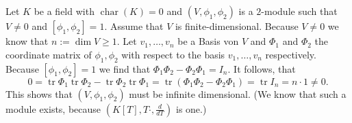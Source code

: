 \documentclass[a4paper,10pt]{article}
\newcommand{\kchar}{\operatorname{char}}
\newcommand{\tr}{\operatorname{tr}}
\begin{document}
\section{}
Let $K$ be a field with $\kchar(K) = 0$ and $(V,\phi_1,\phi_2)$ is a  $2$-module such that $V \neq 0$ and $[\phi_1, \phi_2] = 1$. Assume that $V$ is finite-dimensional. Because $V \neq 0$ we know that $n := \dim V \geq 1$. Let $v_1, \ldots, v_n$ be a Basis von $V$ and $\Phi_1$ and $\Phi_2$ the coordinate matrix of $\phi_1, \phi_2$ with respect to the basis $v_1, \ldots, v_n$ respectively. Because $[\phi_1, \phi_2] = 1$ we find that $\Phi_1 \Phi_2 - \Phi_2 \Phi_1 = I_n$. It follows, that
\[
 0
 = \tr \Phi_1 \tr \Phi_2 - \tr \Phi_2 \tr \Phi_1
 = \tr (\Phi_1\Phi_2-\Phi_2\Phi_1)
 = \tr I_n
 = n \cdot 1
 \neq 0.
\]
This shows that $(V,\phi_1,\phi_2)$ must be infinite dimensional. (We know that such a module exists, because $\left(K[T], T\cdot, \frac{d}{dT}\right)$ is one.)
\end{document}
